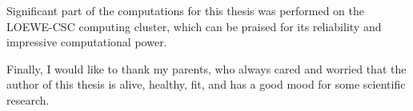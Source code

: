 \begin{acknowledgements}
Significant part of the computations for this thesis was performed on the
LOEWE-CSC computing cluster, which can be praised for its reliability and
impressive computational power.

Finally, I would like to thank my parents, who always cared and worried that
the author of this thesis is alive, healthy, fit, and has a good mood for some
scientific research.


\end{acknowledgements}






